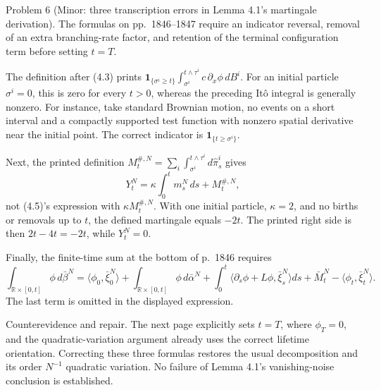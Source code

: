 \documentclass[10pt]{article}
\begin{document}
Problem 6 (Minor: three transcription errors in Lemma 4.1’s martingale derivation).  The formulas on pp. 1846–1847 require an indicator reversal, removal of an extra branching-rate factor, and retention of the terminal configuration term before setting \(t=T\).\par
The definition after (4.3) prints \(\mathbf1_{\{\sigma^i\geq t\}}\int_{\sigma^i}^{t\wedge\tau^i}c\,\partial_x\phi\,dB^i\). For an initial particle \(\sigma^i=0\), this is zero for every \(t>0\), whereas the preceding Itô integral is generally nonzero. For instance, take standard Brownian motion, no events on a short interval and a compactly supported test function with nonzero spatial derivative near the initial point. The correct indicator is \(\mathbf1_{\{t\geq\sigma^i\}}\).\par
Next, the printed definition \(M_t^{\#,N}=\sum_i\int_{\sigma^i}^{t\wedge\tau^i}d\widehat\pi_s^i\) gives \[Y_t^N=\kappa\int_0^t m_s^N\,ds+M_t^{\#,N},\] not (4.5)’s expression with \(\kappa M_t^{\#,N}\). With one initial particle, \(\kappa=2\), and no births or removals up to \(t\), the defined martingale equals \(-2t\). The printed right side is then \(2t-4t=-2t\), while \(Y_t^N=0\).\par
Finally, the finite-time sum at the bottom of p. 1846 requires \[\int_{\mathbb R\times[0,t]}\phi\,d\bar\beta^N
=\langle\phi_0,\bar\xi_0^N\rangle
+\int_{\mathbb R\times[0,t]}\phi\,d\bar\alpha^N
+\int_0^t\langle\partial_s\phi+L\phi,\bar\xi_s^N\rangle ds
+\bar M_t^N-\langle\phi_t,\bar\xi_t^N\rangle.\] The last term is omitted in the displayed expression.\par
Counterevidence and repair. The next page explicitly sets \(t=T\), where \(\phi_T=0\), and the quadratic-variation argument already uses the correct lifetime orientation. Correcting these three formulas restores the usual decomposition and its order \(N^{-1}\) quadratic variation. No failure of Lemma 4.1’s vanishing-noise conclusion is established.\par
\end{document}

